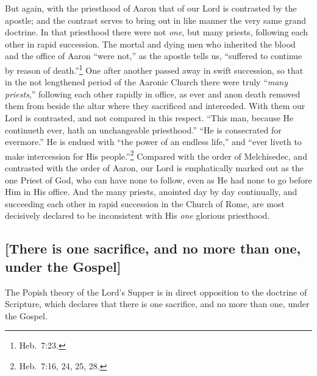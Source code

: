 \documentclass[
  english,
]{book}
\begin{document}
But again, with the priesthood of Aaron that of our Lord is contrasted by the apostle; and the contrast serves to bring out in like manner the very same grand doctrine. In that priesthood there were not \emph{one}, but many priests, following each other in rapid succession. The mortal and dying men who inherited the blood and the office of Aaron ``were not,'' as the apostle tells us, ``suffered to continue by reason of death.''\footnote{Heb.~7:23.} One after another passed away in swift succession, so that in the not lengthened period of the Aaronic Church there were truly ``\emph{many priests},'' following each other rapidly in office, as ever and anon death removed them from beside the altar where they sacrificed and interceded. With them our Lord is contrasted, and not compared in this respect. ``This man, because He continueth ever, hath an unchangeable priesthood.'' ``He is consecrated for evermore.'' He is endued with ``the power of an endless life,'' and ``ever liveth to make intercession for His people.''\footnote{Heb.~7:16, 24, 25, 28.} Compared with the order of Melchisedec, and contrasted with the order of Aaron, our Lord is emphatically marked out as the one Priest of God, who can have none to follow, even as He had none to go before Him in His office. And the many priests, anointed day by day continually, and succeeding each other in rapid succession in the Church of Rome, are most decisively declared to be inconsistent with His \emph{one} glorious priesthood.

\hypertarget{there-is-one-sacrifice-and-no-more-than-one-under-the-gospel}{%
\subsection{{[}There is one sacrifice, and no more than one, under the Gospel{]}}\label{there-is-one-sacrifice-and-no-more-than-one-under-the-gospel}}

The Popish theory of the Lord's Supper is in direct opposition to the doctrine of Scripture, which declares that there is one sacrifice, and no more than one, under the Gospel.
\end{document}
